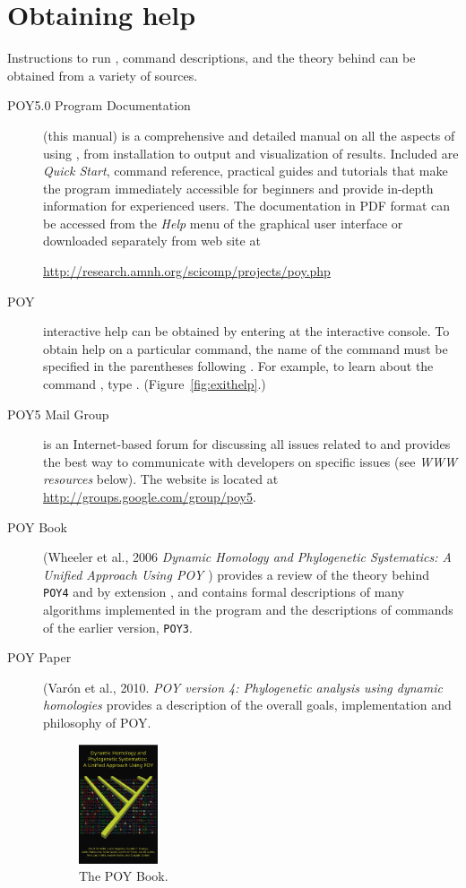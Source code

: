 {\section{Obtaining help} \label{sec:help}
Instructions to run \poy, command descriptions, and the theory behind \poy can be obtained from a variety of sources.
\begin{description}
\item[POY5.0 Program Documentation] (this manual) is a comprehensive and detailed manual on all the aspects of 
using \poy, from installation to output and visualization of results. Included are \emph{Quick Start}, \poy command 
reference, practical guides and tutorials that make the program immediately accessible for beginners and provide 
in-depth information for experienced users. The documentation in PDF format can be accessed from the \emph{Help} 
menu of the graphical user interface or downloaded separately from \poy web site at
\begin{center}
\url{http://research.amnh.org/scicomp/projects/poy.php}
\end{center}
\item[POY] interactive help can be obtained by entering  at the \poy interactive console. To obtain help on a particular command, the name of the command must be specified in the parentheses following . For example, to learn about the command , type . (Figure~\ref{fig:exithelp}.)
\item[POY5 Mail Group] is an Internet-based forum for discussing all issues related to \poy and provides the best way to communicate with \poy developers on specific issues (see \emph{WWW resources} below). The website is located at \url{http://groups.google.com/group/poy5}. 
\item[POY Book] (Wheeler et al., 2006 \emph{Dynamic Homology and Phylogenetic Systematics: A Unified Approach Using POY \cite{wheeleretal2006}}) provides a review of the theory behind \texttt{POY4} and by extension \poy, and contains formal descriptions of many algorithms implemented in the program and the descriptions of commands of the earlier version, \texttt{POY3}.
\item[POY Paper] (Var\'on et al., 2010. \emph{POY version 4: Phylogenetic analysis using dynamic homologies \cite{Varonetal2010}} 
provides a description of the overall goals, implementation and philosophy of POY.

\begin{figure}[htbp]
   \centering
   \includegraphics[width=0.23\textwidth]{doc/figures/figpoybook.jpg}
   \caption{The POY Book.}
   \label{fig:figprocess}
\end{figure}
\end{description}

}
